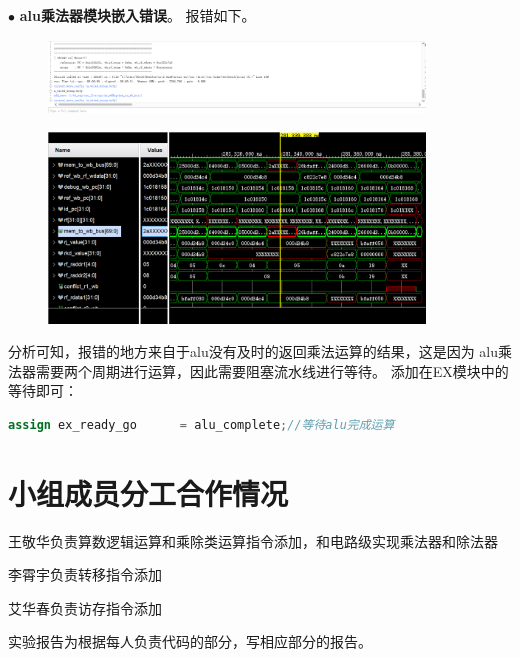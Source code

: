 \documentclass[11pt]{article}
\begin{document}
\noindent
$\bullet$
\textbf{alu乘法器模块嵌入错误}。
报错如下。
\begin{figure}[H]
  \centering
  \includegraphics[width=10cm]{fig/2.png}
\end{figure}
\begin{figure}[H]
  \centering
  \includegraphics[width=10cm]{fig/3.png}
\end{figure}

分析可知，报错的地方来自于alu没有及时的返回乘法运算的结果，这是因为
alu乘法器需要两个周期进行运算，因此需要阻塞流水线进行等待。
添加在EX模块中的等待即可：
\begin{lstlisting}[language=verilog]
  assign ex_ready_go      = alu_complete;//等待alu完成运算
\end{lstlisting}
\section{小组成员分工合作情况}
王敬华负责算数逻辑运算和乘除类运算指令添加，和电路级实现乘法器和除法器

李霄宇负责转移指令添加

艾华春负责访存指令添加

实验报告为根据每人负责代码的部分，写相应部分的报告。
\end{document}
